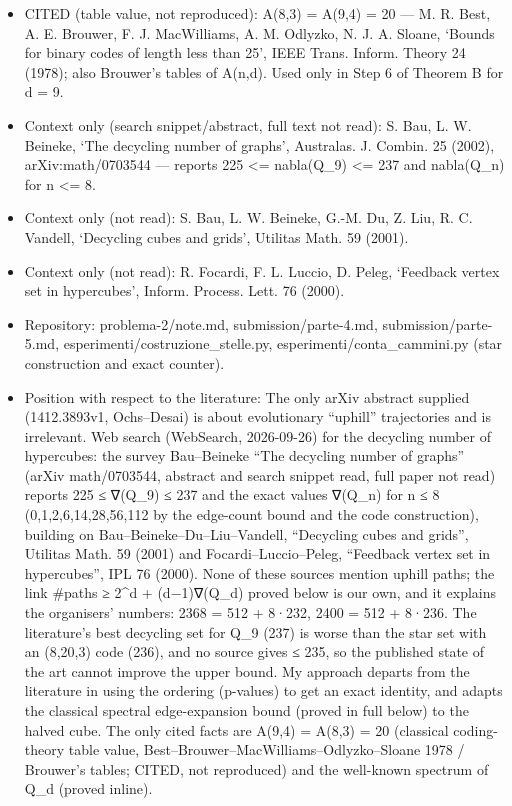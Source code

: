 \documentclass[11pt,a4paper]{article}
\providecommand{\tightlist}{\setlength{\itemsep}{0pt}\setlength{\parskip}{0pt}}
\begin{document}
\begin{itemize}
\tightlist
\item
  CITED (table value, not reproduced): A(8,3) = A(9,4) = 20 --- M. R.
  Best, A. E. Brouwer, F. J. MacWilliams, A. M. Odlyzko, N. J. A.
  Sloane, `Bounds for binary codes of length less than 25', IEEE Trans.
  Inform. Theory 24 (1978); also Brouwer's tables of A(n,d). Used only
  in Step 6 of Theorem B for d = 9.
\item
  Context only (search snippet/abstract, full text not read): S. Bau, L.
  W. Beineke, `The decycling number of graphs', Australas. J. Combin. 25
  (2002), arXiv:math/0703544 --- reports 225 \textless= nabla(Q\_9)
  \textless= 237 and nabla(Q\_n) for n \textless= 8.
\item
  Context only (not read): S. Bau, L. W. Beineke, G.-M. Du, Z. Liu, R.
  C. Vandell, `Decycling cubes and grids', Utilitas Math. 59 (2001).
\item
  Context only (not read): R. Focardi, F. L. Luccio, D. Peleg, `Feedback
  vertex set in hypercubes', Inform. Process. Lett. 76 (2000).
\item
  Repository: problema-2/note.md, submission/parte-4.md,
  submission/parte-5.md, esperimenti/costruzione\_stelle.py,
  esperimenti/conta\_cammini.py (star construction and exact counter).
\item
  Position with respect to the literature: The only arXiv abstract
  supplied (1412.3893v1, Ochs--Desai) is about evolutionary ``uphill''
  trajectories and is irrelevant. Web search (WebSearch, 2026-09-26) for
  the decycling number of hypercubes: the survey Bau--Beineke ``The
  decycling number of graphs'' (arXiv math/0703544, abstract and search
  snippet read, full paper not read) reports 225 ≤ ∇(Q\_9) ≤ 237 and the
  exact values ∇(Q\_n) for n ≤ 8 (0,1,2,6,14,28,56,112 by the edge-count
  bound and the code construction), building on
  Bau--Beineke--Du--Liu--Vandell, ``Decycling cubes and grids'',
  Utilitas Math. 59 (2001) and Focardi--Luccio--Peleg, ``Feedback vertex
  set in hypercubes'', IPL 76 (2000). None of these sources mention
  uphill paths; the link \#paths ≥ 2\^{}d + (d−1)∇(Q\_d) proved below is
  our own, and it explains the organisers' numbers: 2368 = 512 + 8·232,
  2400 = 512 + 8·236. The literature's best decycling set for Q\_9 (237)
  is worse than the star set with an (8,20,3) code (236), and no source
  gives ≤ 235, so the published state of the art cannot improve the
  upper bound. My approach departs from the literature in using the
  ordering (p-values) to get an exact identity, and adapts the classical
  spectral edge-expansion bound (proved in full below) to the halved
  cube. The only cited facts are A(9,4) = A(8,3) = 20 (classical
  coding-theory table value, Best--Brouwer--MacWilliams--Odlyzko--Sloane
  1978 / Brouwer's tables; CITED, not reproduced) and the well-known
  spectrum of Q\_d (proved inline).
\end{itemize}
\end{document}
